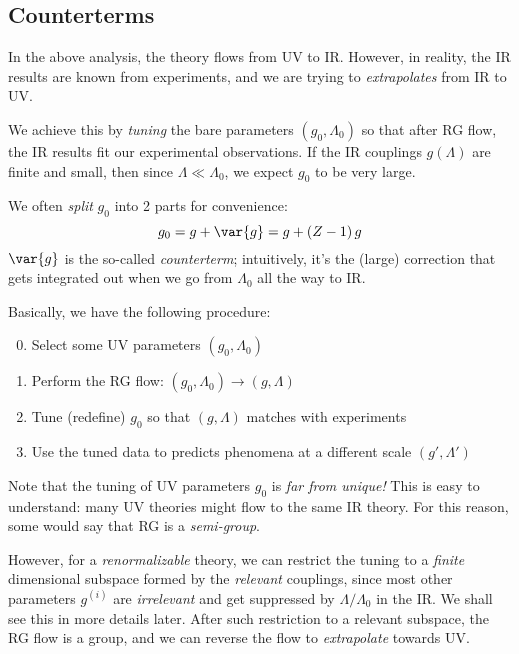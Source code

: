 \documentclass[a4paper
	,10pt
]{article}
\begin{document}
\subsection{Counterterms}
	In the above analysis, the theory flows from UV to IR. However, in
	reality, the IR results are known from experiments, and we are trying to
	\emph{extrapolates} from IR to UV.
	
	We achieve this by \emph{tuning} the bare parameters $(g_0,\Lambda_0)$
	so that after RG flow, the IR results fit our experimental observations.
	If the IR couplings $g(\Lambda)$ are finite and small, then since
	$\Lambda \ll \Lambda_0$, we expect $g_0$ to be very large.
	
	We often \emph{split} $g_0$ into 2 parts for convenience:
	\begin{equation}
	  g_0 = g + \var{g}
	  = g + (Z - 1)\,g
	\end{equation}
	$\var{g}$ is the so-called \emph{counterterm}; intuitively, it's the
	(large) correction that gets integrated out when we go from
	$\Lambda_0$ all the way to IR.
	
	Basically, we have the following procedure:
	
	\begin{figure}[!h]
	\centering
	\end{figure}
	
	\begin{enumerate}[noitemsep,midpenalty=100]
	\setcounter{enumi}{-1}
	
	\item
	  Select some UV parameters $(g_0,\Lambda_0)$
	\item
	  Perform the RG flow: $(g_0,\Lambda_0)\to (g,\Lambda)$
	\item
	  Tune (redefine) $g_0$ so that $(g,\Lambda)$ matches with
	  experiments
	\item
	  Use the tuned data to predicts phenomena at a different scale
	  $(g',\Lambda')$
	\end{enumerate}
	
	Note that the tuning of UV parameters $g_0$ is \emph{far from unique!}
	This is easy to understand: many UV theories might flow to the same IR
	theory. For this reason, some would say that RG is a \emph{semi-group}.
	
	However, for a \emph{renormalizable} theory, we can restrict the tuning
	to a \emph{finite} dimensional subspace formed by the \emph{relevant}
	couplings, since most other parameters $g^{(i)}$ are \emph{irrelevant}
	and get suppressed by $\Lambda/\Lambda_0$ in the IR. We shall see this in more details later. After such
	restriction to a relevant subspace, the RG flow is a group, and we can
	reverse the flow to \emph{extrapolate} towards UV.
	
\end{document}
